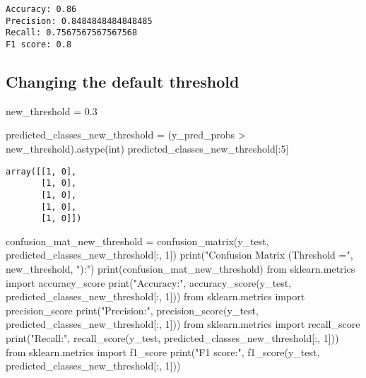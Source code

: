 \documentclass[
  letterpaper,
  DIV=11,
  numbers=noendperiod]{scrreprt}
\newenvironment{Shaded}{\begin{snugshade}}{\end{snugshade}}
\newcommand{\BuiltInTok}[1]{\textcolor[rgb]{0.00,0.23,0.31}{#1}}
\newcommand{\DecValTok}[1]{\textcolor[rgb]{0.68,0.00,0.00}{#1}}
\newcommand{\FloatTok}[1]{\textcolor[rgb]{0.68,0.00,0.00}{#1}}
\newcommand{\ImportTok}[1]{\textcolor[rgb]{0.00,0.46,0.62}{#1}}
\newcommand{\NormalTok}[1]{\textcolor[rgb]{0.00,0.23,0.31}{#1}}
\newcommand{\OperatorTok}[1]{\textcolor[rgb]{0.37,0.37,0.37}{#1}}
\newcommand{\StringTok}[1]{\textcolor[rgb]{0.13,0.47,0.30}{#1}}
\begin{document}
\begin{verbatim}
Accuracy: 0.86
Precision: 0.8484848484848485
Recall: 0.7567567567567568
F1 score: 0.8
\end{verbatim}

\subsection{Changing the default
threshold}\label{changing-the-default-threshold}

\begin{Shaded}
\begin{Highlighting}[]
\NormalTok{new\_threshold }\OperatorTok{=} \FloatTok{0.3}
\end{Highlighting}
\end{Shaded}

\begin{Shaded}
\begin{Highlighting}[]
\NormalTok{predicted\_classes\_new\_threshold }\OperatorTok{=}\NormalTok{ (y\_pred\_probs }\OperatorTok{\textgreater{}}\NormalTok{ new\_threshold).astype(}\BuiltInTok{int}\NormalTok{)}
\NormalTok{predicted\_classes\_new\_threshold[:}\DecValTok{5}\NormalTok{]}
\end{Highlighting}
\end{Shaded}

\begin{verbatim}
array([[1, 0],
       [1, 0],
       [1, 0],
       [1, 0],
       [1, 0]])
\end{verbatim}

\begin{Shaded}
\begin{Highlighting}[]
\NormalTok{confusion\_mat\_new\_threshold }\OperatorTok{=}\NormalTok{ confusion\_matrix(y\_test, predicted\_classes\_new\_threshold[:, }\DecValTok{1}\NormalTok{])}
\BuiltInTok{print}\NormalTok{(}\StringTok{"Confusion Matrix (Threshold ="}\NormalTok{, new\_threshold, }\StringTok{"):"}\NormalTok{)}
\BuiltInTok{print}\NormalTok{(confusion\_mat\_new\_threshold)}
\ImportTok{from}\NormalTok{ sklearn.metrics }\ImportTok{import}\NormalTok{ accuracy\_score}
\BuiltInTok{print}\NormalTok{(}\StringTok{"Accuracy:"}\NormalTok{, accuracy\_score(y\_test, predicted\_classes\_new\_threshold[:, }\DecValTok{1}\NormalTok{]))}
\ImportTok{from}\NormalTok{ sklearn.metrics }\ImportTok{import}\NormalTok{ precision\_score}
\BuiltInTok{print}\NormalTok{(}\StringTok{"Precision:"}\NormalTok{, precision\_score(y\_test, predicted\_classes\_new\_threshold[:, }\DecValTok{1}\NormalTok{]))}
\ImportTok{from}\NormalTok{ sklearn.metrics }\ImportTok{import}\NormalTok{ recall\_score}
\BuiltInTok{print}\NormalTok{(}\StringTok{"Recall:"}\NormalTok{, recall\_score(y\_test, predicted\_classes\_new\_threshold[:, }\DecValTok{1}\NormalTok{]))}
\ImportTok{from}\NormalTok{ sklearn.metrics }\ImportTok{import}\NormalTok{ f1\_score}
\BuiltInTok{print}\NormalTok{(}\StringTok{"F1 score:"}\NormalTok{,  f1\_score(y\_test, predicted\_classes\_new\_threshold[:, }\DecValTok{1}\NormalTok{]))}
\end{Highlighting}
\end{Shaded}
\end{document}
